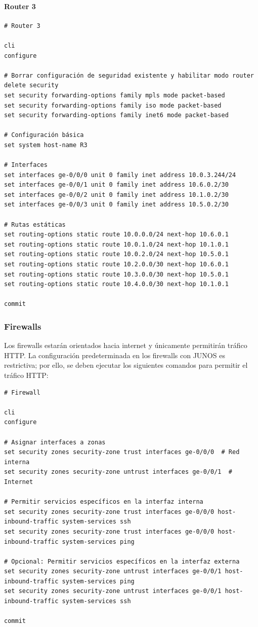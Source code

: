 \documentclass[%
    school=etsisi,%
    degree=61TI,%
]{upm-report}
\begin{document}
\paragraph{Router 3}

\begin{lstlisting}[breaklines]
# Router 3

cli
configure

# Borrar configuración de seguridad existente y habilitar modo router
delete security
set security forwarding-options family mpls mode packet-based
set security forwarding-options family iso mode packet-based
set security forwarding-options family inet6 mode packet-based

# Configuración básica
set system host-name R3

# Interfaces
set interfaces ge-0/0/0 unit 0 family inet address 10.0.3.244/24
set interfaces ge-0/0/1 unit 0 family inet address 10.6.0.2/30
set interfaces ge-0/0/2 unit 0 family inet address 10.1.0.2/30
set interfaces ge-0/0/3 unit 0 family inet address 10.5.0.2/30

# Rutas estáticas
set routing-options static route 10.0.0.0/24 next-hop 10.6.0.1
set routing-options static route 10.0.1.0/24 next-hop 10.1.0.1
set routing-options static route 10.0.2.0/24 next-hop 10.5.0.1
set routing-options static route 10.2.0.0/30 next-hop 10.6.0.1
set routing-options static route 10.3.0.0/30 next-hop 10.5.0.1
set routing-options static route 10.4.0.0/30 next-hop 10.1.0.1

commit
\end{lstlisting}

\subsubsection{Firewalls}

Los firewalls estarán orientados hacia internet y únicamente permitirán tráfico HTTP. La configuración predeterminada en los firewalls con JUNOS es restrictiva; por ello, se deben ejecutar los siguientes comandos para permitir el tráfico HTTP:

\begin{lstlisting}[breaklines]
# Firewall

cli
configure

# Asignar interfaces a zonas
set security zones security-zone trust interfaces ge-0/0/0  # Red interna
set security zones security-zone untrust interfaces ge-0/0/1  # Internet

# Permitir servicios específicos en la interfaz interna
set security zones security-zone trust interfaces ge-0/0/0 host-inbound-traffic system-services ssh
set security zones security-zone trust interfaces ge-0/0/0 host-inbound-traffic system-services ping

# Opcional: Permitir servicios específicos en la interfaz externa
set security zones security-zone untrust interfaces ge-0/0/1 host-inbound-traffic system-services ping
set security zones security-zone untrust interfaces ge-0/0/1 host-inbound-traffic system-services ssh

commit
\end{lstlisting}
\end{document}
